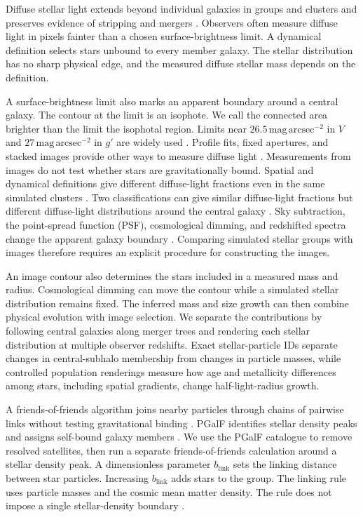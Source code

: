 \documentclass[usenatbib]{mnras}
\begin{document}
Diffuse stellar light extends beyond individual galaxies in groups and
clusters and preserves evidence of stripping and mergers
\citep{zwicky1951,mihos2005,mihos2017,rudick2011,contini2021,montes2022}.
Observers often measure diffuse light in pixels fainter than a chosen
surface-brightness limit. A dynamical definition selects stars unbound
to every member galaxy. The stellar distribution has no sharp physical
edge, and the measured diffuse stellar mass depends on the definition.

A surface-brightness limit also marks an apparent boundary around a
central galaxy. The contour at the limit is an isophote. We call the
connected area brighter than the limit the isophotal region.
Limits near $26.5\,\mathrm{mag\,arcsec}^{-2}$ in $V$
and $27\,\mathrm{mag\,arcsec}^{-2}$ in $g'$ are widely used
\citep{feldmeier2004,zibetti2005,burke2015,kluge2020,montenegro2025}.
Profile fits, fixed apertures, and stacked images provide other ways
to measure diffuse light \citep{gonzalez2005,gonzalez2007,zhang2019,montenegro2023}.
Measurements from images do not test whether stars are gravitationally
bound. Spatial and dynamical definitions give different diffuse-light
fractions even in the same simulated clusters
\citep{rudick2011,cui2014,brough2024}.
Two classifications can give similar diffuse-light fractions but
different diffuse-light distributions around the central galaxy
\citep{montenegro2025}.
Sky subtraction, the point-spread function (PSF), cosmological dimming,
and redshifted spectra change the apparent galaxy boundary
\citep{tolman1930,tang2018}.
Comparing simulated stellar groups with images therefore requires an
explicit procedure for constructing the images.

An image contour also determines the stars included in a measured mass
and radius. Cosmological dimming can move the contour while a
simulated stellar distribution remains fixed. The inferred mass and size
growth can then combine physical evolution with image selection. We
separate the contributions by following central galaxies along merger
trees and rendering each stellar distribution at multiple observer
redshifts. Exact stellar-particle IDs separate changes in central-subhalo
membership from changes in particle masses, while controlled population
renderings measure how age and metallicity differences among stars,
including spatial gradients, change half-light-radius growth.

A friends-of-friends algorithm joins nearby particles through chains
of pairwise links without testing gravitational binding \citep{davis1985}.
PGalF identifies stellar density peaks and assigns self-bound galaxy
members \citep{kim2023}. We use the PGalF catalogue to remove resolved
satellites, then run a separate friends-of-friends calculation around
a stellar density peak. A dimensionless parameter $b_{\mathrm{link}}$ sets the linking
distance between star particles. Increasing $b_{\mathrm{link}}$ adds stars to the group.
The linking rule uses particle masses and the cosmic mean matter
density. The rule does not impose a single stellar-density boundary
\citep{more2011}.
\end{document}

